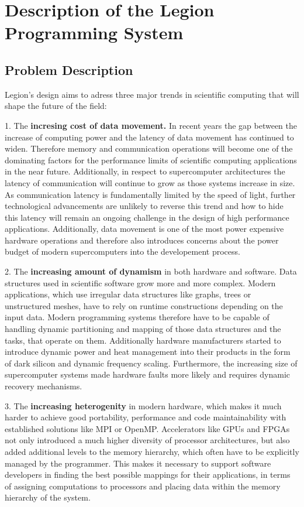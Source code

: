 \documentclass{article}      %
\begin{document}
\section{Description of the Legion Programming System}

\subsection{Problem Description}
Legion's design aims to adress three major trends in scientific computing that will shape the future of the field:

1. The \textbf{incresing cost of data movement.} In recent years the gap between the increase of computing power and the latency of data movement has continued to widen. Therefore memory and communication operations will become one of the dominating factors for the performance limits of scientific computing applications in the near future. Additionally, in respect to supercomputer architectures the latency of communication will continue to grow as those systems increase in size. As communication latency is fundamentally limited by the speed of light, further technological advancements are unlikely to reverse this trend and how to hide this latency will remain an ongoing challenge in the design of high performance applications. Additionally, data movement is one of the most power expensive hardware operations and therefore also introduces concerns about the power budget of modern supercomputers into the developement process.


2. The \textbf{increasing amount of dynamism} in both hardware and software. Data structures used in scientific software grow more and more complex. Modern applications, which use irregular data structures like graphs, trees or unstructured meshes, have to rely on runtime constructions depending on the input data. Modern programming systems therefore have to be capable of handling dynamic partitioning and mapping of those data structures and the tasks, that operate on them. Additionally hardware manufacturers started to introduce dynamic power and heat management into their products in the form of dark silicon and dynamic frequency scaling. Furthermore, the increasing size of supercomputer systems made hardware faults more likely and requires dynamic recovery mechanisms.


3. The \textbf{increasing heterogenity} in modern hardware,  which makes it much harder to achieve good portability, performance and code maintainability with established solutions like MPI or OpenMP. Accelerators like GPUs and FPGAs not only introduced a much higher diversity of processor architectures, but also added additional levels to the memory hierarchy, which often have to be explicitly managed by the programmer. This makes it necessary to support software developers in finding the best possible mappings for their applications, in terms of assigning computations to processors and placing data within the memory hierarchy of the system.
\end{document}
